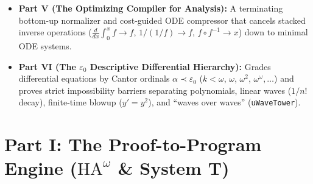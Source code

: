 \documentclass[11pt,a4paper]{article}
\newcommand{\HAomega}{\ensuremath{\mathrm{HA}^{\omega}}}
\newcommand{\lean}[1]{\texttt{\nolinkurl{#1}}}
\begin{document}
\begin{enumerate}
\begin{itemize}
    \item \textbf{Part V (The Optimizing Compiler for Analysis):} A terminating bottom-up normalizer and cost-guided ODE compressor that cancels stacked inverse operations ($\frac{d}{dx}\int_0^x f \to f$, $1/(1/f) \to f$, $f \circ f^{-1} \to x$) down to minimal ODE systems.
    \item \textbf{Part VI (The $\varepsilon_0$ Descriptive Differential Hierarchy):} Grades differential equations by Cantor ordinals $\alpha \prec \varepsilon_0$ ($k < \omega$, $\omega$, $\omega^2$, $\omega^\omega, \dots$) and proves strict impossibility barriers separating polynomials, linear waves ($1/n!$ decay), finite-time blowup ($y'=y^2$), and ``waves over waves'' (\lean{uWaveTower}).
  \end{itemize}
\end{enumerate}

\newpage
\section{Part I: The Proof-to-Program Engine (\texorpdfstring{$\HAomega$}{HAomega} \& System T)}
\end{document}
